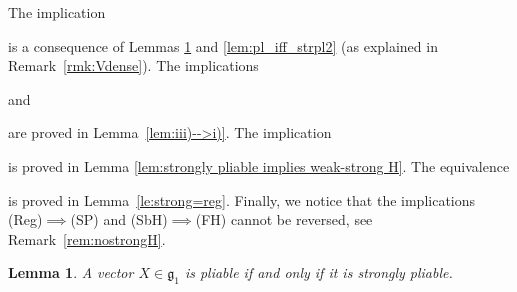 \documentclass[pdftex]{sigma}
\numberwithin{equation}{section}
\newtheorem{Lemma}[Theorem]{Lemma}
\theoremstyle{definition}
\begin{document}
The implication
 is a consequence of Lemmas \ref{lem:pl_iff_strpl} and \ref{lem:pl_iff_strpl2} (as explained in Remark~\ref{rmk:Vdense}). The implications 
 and
 are proved in Lemma~\ref{lem:iii)-->i)}. The implication  is proved in Lemma \ref{lem:strongly pliable implies weak-strong H}. The equivalence  is proved in Lemma~\ref{le:strong=reg}. Finally, we notice that the implications (Reg)$\implies$(SP) and (SbH)$\implies$(FH) cannot be reversed, see Remark~\ref{rem:nostrongH}.

\begin{Lemma}\label{lem:pl_iff_strpl}
 A vector $X\in{\mathfrak g}_1$ is pliable if and only if it is strongly pliable.
\end{Lemma}
\end{document}
